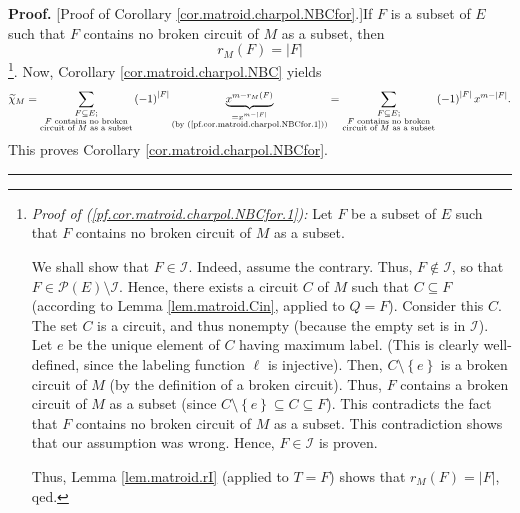 \documentclass[numbers=enddot,12pt,final,onecolumn,notitlepage]{scrartcl}%
\theoremstyle{definition}
\newenvironment{proof}[1][Proof]{\noindent\textbf{#1.} }{\ \rule{0.5em}{0.5em}}
\let\sumnonlimits\sum
\renewcommand{\sum}{\sumnonlimits\limits}
\begin{document}
\begin{proof}
[Proof of Corollary \ref{cor.matroid.charpol.NBCfor}.]If $F$ is a subset of
$E$ such that $F$ contains no broken circuit of $M$ as a subset, then%
\begin{equation}
r_{M}\left(  F\right)  =\left\vert F\right\vert
\label{pf.cor.matroid.charpol.NBCfor.1}%
\end{equation}
\footnote{\textit{Proof of (\ref{pf.cor.matroid.charpol.NBCfor.1}):} Let $F$
be a subset of $E$ such that $F$ contains no broken circuit of $M$ as a
subset.
\par
We shall show that $F\in\mathcal{I}$. Indeed, assume the contrary. Thus,
$F\notin\mathcal{I}$, so that $F\in\mathcal{P}\left(  E\right)  \setminus
\mathcal{I}$. Hence, there exists a circuit $C$ of $M$ such that $C\subseteq
F$ (according to Lemma \ref{lem.matroid.Cin}, applied to $Q=F$). Consider this
$C$. The set $C$ is a circuit, and thus nonempty (because the empty set is in
$\mathcal{I}$). Let $e$ be the unique element of $C$ having maximum label.
(This is clearly well-defined, since the labeling function $\ell$ is
injective). Then, $C\setminus\left\{  e\right\}  $ is a broken circuit of $M$
(by the definition of a broken circuit). Thus, $F$ contains a broken circuit
of $M$ as a subset (since $C\setminus\left\{  e\right\}  \subseteq C\subseteq
F$). This contradicts the fact that $F$ contains no broken circuit of $M$ as a
subset. This contradiction shows that our assumption was wrong. Hence,
$F\in\mathcal{I}$ is proven.
\par
Thus, Lemma \ref{lem.matroid.rI} (applied to $T=F$) shows that $r_{M}\left(
F\right)  =\left\vert F\right\vert $, qed.}. Now, Corollary
\ref{cor.matroid.charpol.NBC} yields%
\[
\widetilde{\chi}_{M}=\sum_{\substack{F\subseteq E;\\F\text{ contains no
broken}\\\text{circuit of }M\text{ as a subset}}}\left(  -1\right)
^{\left\vert F\right\vert }\underbrace{x^{m-r_{M}\left(  F\right)  }%
}_{\substack{=x^{m-\left\vert F\right\vert }\\\text{(by
(\ref{pf.cor.matroid.charpol.NBCfor.1}))}}}=\sum_{\substack{F\subseteq
E;\\F\text{ contains no broken}\\\text{circuit of }M\text{ as a subset}%
}}\left(  -1\right)  ^{\left\vert F\right\vert }x^{m-\left\vert F\right\vert
}.
\]
This proves Corollary \ref{cor.matroid.charpol.NBCfor}.
\end{proof}
\end{document}
